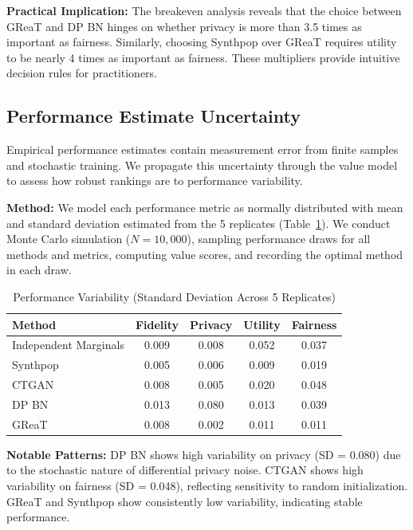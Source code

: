 \documentclass[12pt,a4paper]{article}
\begin{document}
\textbf{Practical Implication:} The breakeven analysis reveals that the choice between GReaT and DP BN hinges on whether privacy is more than 3.5 times as important as fairness. Similarly, choosing Synthpop over GReaT requires utility to be nearly 4 times as important as fairness. These multipliers provide intuitive decision rules for practitioners.

\subsection{Performance Estimate Uncertainty}

Empirical performance estimates contain measurement error from finite samples and stochastic training. We propagate this uncertainty through the value model to assess how robust rankings are to performance variability.

\textbf{Method:} We model each performance metric as normally distributed with mean and standard deviation estimated from the 5 replicates (Table~\ref{tab:performance_sd}). We conduct Monte Carlo simulation ($N = 10{,}000$), sampling performance draws for all methods and metrics, computing value scores, and recording the optimal method in each draw.

\begin{table}[htbp]
\centering
\caption{Performance Variability (Standard Deviation Across 5 Replicates)}
\label{tab:performance_sd}
\begin{tabular}{@{}lcccc@{}}
\toprule
\textbf{Method} & \textbf{Fidelity} & \textbf{Privacy} & \textbf{Utility} & \textbf{Fairness} \\
\midrule
Independent Marginals & 0.009 & 0.008 & 0.052 & 0.037 \\
Synthpop & 0.005 & 0.006 & 0.009 & 0.019 \\
CTGAN & 0.008 & 0.005 & 0.020 & 0.048 \\
DP BN & 0.013 & 0.080 & 0.013 & 0.039 \\
GReaT & 0.008 & 0.002 & 0.011 & 0.011 \\
\bottomrule
\end{tabular}
\end{table}

\textbf{Notable Patterns:} DP BN shows high variability on privacy (SD = 0.080) due to the stochastic nature of differential privacy noise. CTGAN shows high variability on fairness (SD = 0.048), reflecting sensitivity to random initialization. GReaT and Synthpop show consistently low variability, indicating stable performance.
\end{document}
